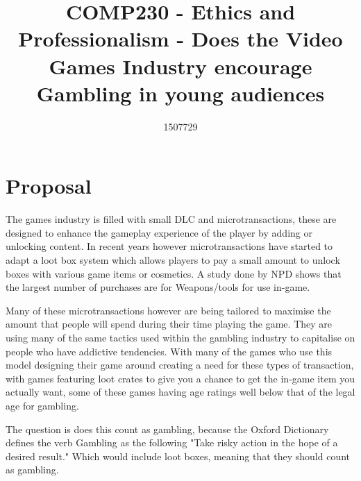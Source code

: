 \documentclass{scrartcl}
\title{COMP230 - Ethics and Professionalism - Does the Video Games Industry encourage Gambling in young audiences}
\author{1507729}
\begin{document}
\maketitle

\section{Proposal}
The games industry is filled with small DLC and microtransactions, these are designed to enhance the gameplay experience of the player by adding or unlocking content. In recent years however microtransactions have started to adapt a loot box system which allows players to pay a small amount to unlock boxes with various game items or cosmetics. A study done by NPD shows that the largest number of purchases are for Weapons/tools for use in-game. 

Many of these microtransactions however are being tailored to maximise the amount that people will spend during their time playing the game. They are using many of the same tactics used within the gambling industry to capitalise on people who have addictive tendencies. With many of the games who use this model designing their game around creating a need for these types of transaction, with games featuring loot crates to give you a chance to get the in-game item you actually want, some of these games having age ratings well below that of the legal age for gambling.

The question is does this count as gambling, because the Oxford Dictionary defines the verb Gambling as the following "Take risky action in the hope of a desired result." Which would include loot boxes, meaning that they should count as gambling.




\end{document}
